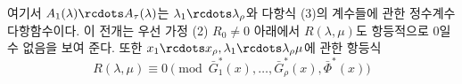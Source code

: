 
여기서 $A_1(\lambda)\rcdots A_\tau(\lambda)$는 $\lambda_1\rcdots\lambda_\rho$와 다항식 (3)의 계수들에 관한 정수계수 다항함수이다. 이 전개는 우선 가정 (2) $R_0\ne0$ 아래에서 $R(\lambda,\mu)$도 항등적으로 0일 수 없음을 보여 준다. 또한 $x_1\rcdots x_\rho,\lambda_1\rcdots\lambda_\rho\mu$에 관한 항등식
\[
R(\lambda,\mu)\equiv0\pmod{\bar G_1^*(x),\ldots,\bar G_\rho^*(x),\bar\Phi^*(x)}
\]
